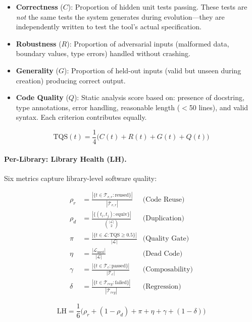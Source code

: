 \documentclass[10pt,twocolumn]{article}
\begin{document}
\begin{itemize}
\item \textbf{Correctness} ($C$): Proportion of hidden unit tests passing. These tests are \emph{not} the same tests the system generates during evolution---they are independently written to test the tool's actual specification.
\item \textbf{Robustness} ($R$): Proportion of adversarial inputs (malformed data, boundary values, type errors) handled without crashing.
\item \textbf{Generality} ($G$): Proportion of held-out inputs (valid but unseen during creation) producing correct output.
\item \textbf{Code Quality} ($Q$): Static analysis score based on: presence of docstring, type annotations, error handling, reasonable length ($<$50 lines), and valid syntax. Each criterion contributes equally.
\end{itemize}

\begin{equation}
\text{TQS}(t) = \frac{1}{4}\bigl(C(t) + R(t) + G(t) + Q(t)\bigr)
\end{equation}

\paragraph{Per-Library: Library Health (LH).}
Six metrics capture library-level software quality:

\begin{align}
\rho_r &= \frac{|\{t \in \mathcal{T}_{v,r} : \text{reused}\}|}{|\mathcal{T}_{v,r}|} & \text{(Code Reuse)} \\[2pt]
\rho_d &= \frac{|\{(t_i,t_j) : \text{equiv}\}|}{\binom{|\mathcal{L}|}{2}} & \text{(Duplication)} \\[2pt]
\pi &= \frac{|\{t \in \mathcal{L} : \text{TQS} \geq 0.5\}|}{|\mathcal{L}|} & \text{(Quality Gate)} \\[2pt]
\eta &= \frac{|\mathcal{L}_{\text{used}}|}{|\mathcal{L}|} & \text{(Dead Code)} \\[2pt]
\gamma &= \frac{|\{t \in \mathcal{T}_c : \text{passed}\}|}{|\mathcal{T}_c|} & \text{(Composability)} \\[2pt]
\delta &= \frac{|\{t \in \mathcal{T}_{reg} : \text{failed}\}|}{|\mathcal{T}_{reg}|} & \text{(Regression)}
\end{align}

\begin{equation}
\text{LH} = \frac{1}{6}\bigl(\rho_r + (1{-}\rho_d) + \pi + \eta + \gamma + (1{-}\delta)\bigr)
\end{equation}
\end{document}
